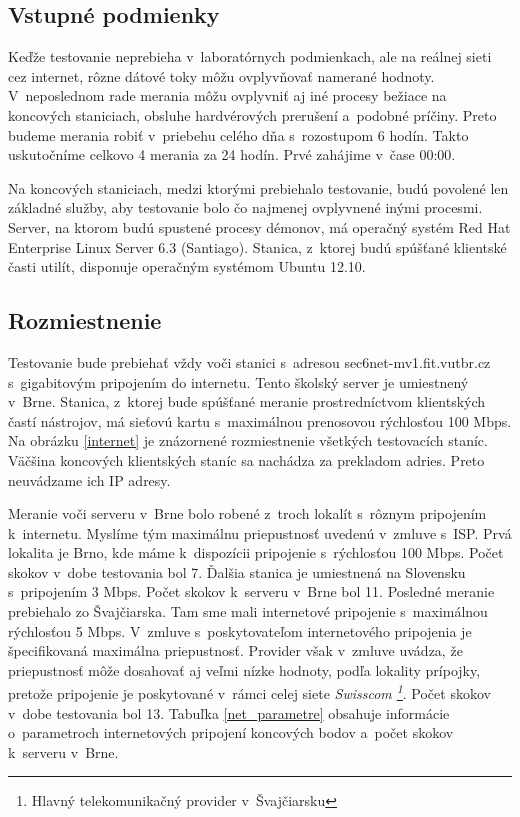 \newpage

    \subsection{Vstupné podmienky} \label{test_podmienky}
        Keďže testovanie neprebieha v~laboratórnych podmienkach, ale na reálnej
        sieti cez internet, rôzne dátové toky môžu ovplyvňovať namerané hodnoty.
        V~neposlednom rade merania môžu ovplyvniť aj iné procesy bežiace na
        koncových staniciach, obsluhe hardvérových prerušení a~podobné príčiny.
        Preto budeme merania robiť v~priebehu celého dňa s~rozostupom 6 hodín. 
        Takto uskutočníme celkovo 4 merania za 24 hodín. Prvé zahájime v~čase 00:00.
        
        Na koncových staniciach, medzi ktorými prebiehalo testovanie, budú
        povolené len základné služby, aby testovanie bolo čo najmenej ovplyvnené 
        inými procesmi. Server, na ktorom budú spustené procesy démonov, má
        operačný systém Red Hat Enterprise Linux Server 6.3 (Santiago). Stanica,
        z~ktorej budú spúšťané klientské časti utilít, disponuje operačným
        systémom Ubuntu 12.10. 

    \subsection{Rozmiestnenie} \label{test_rozmiestnenie}
        Testovanie bude prebiehať vždy voči stanici s~adresou 
        sec6net-mv1.fit.vutbr.cz s~gigabitovým pripojením do internetu. 
        Tento školský server je umiestnený v~Brne. Stanica, z~ktorej
        bude spúšťané meranie prostredníctvom klientských častí nástrojov, má sieťovú
        kartu s~maximálnou prenosovou rýchlosťou 100 Mbps.
        Na obrázku \ref{internet} je znázornené rozmiestnenie všetkých testovacích 
        staníc. Väčšina koncových klientských staníc sa nachádza za prekladom adries.
        Preto neuvádzame ich IP adresy. 

        Meranie voči serveru v~Brne bolo robené z~troch lokalít
        s~rôznym pripojením k~internetu. Myslíme tým maximálnu priepustnosť uvedenú
        v~zmluve s~ISP. Prvá lokalita je Brno, kde máme k~dispozícii pripojenie
        s~rýchlosťou 100 Mbps. Počet skokov v~dobe testovania bol 7. Ďalšia stanica 
        je umiestnená na Slovensku s~pripojením 3 Mbps. Počet skokov k~serveru
        v~Brne bol 11. Posledné meranie prebiehalo zo Švajčiarska. Tam sme mali
        internetové pripojenie s~maximálnou rýchlosťou 5 Mbps. V~zmluve
        s~poskytovateľom internetového pripojenia je špecifikovaná maximálna
        priepustnosť. Provider však v~zmluve uvádza, že priepustnosť môže
        dosahovať aj veľmi nízke hodnoty, podľa lokality prípojky, pretože
        pripojenie je poskytované v~rámci celej siete \emph{Swisscom
        \footnote{Hlavný telekomunikačný provider v~Švajčiarsku}}.
        Počet skokov v~dobe testovania bol 13. Tabuľka \ref{net_parametre}
        obsahuje informácie o~parametroch internetových pripojení koncových
        bodov a~počet skokov k~serveru v~Brne.

